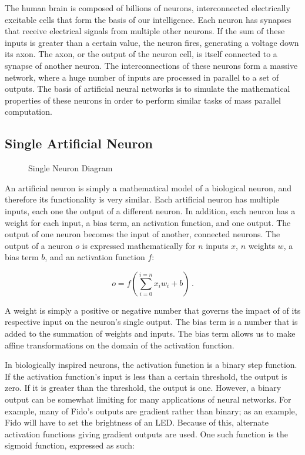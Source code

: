 The human brain is composed of billions of neurons, interconnected electrically excitable cells that form the basis of our intelligence. Each neuron has synapses that receive electrical signals from multiple other neurons. If the sum of these inputs is greater than a certain value, the neuron fires, generating a voltage down its axon. The axon, or the output of the neuron cell, is itself connected to a synapse of another neuron. The interconnections of these neurons form a massive network, where a huge number of inputs are processed in parallel to a set of outputs. The basis of artificial neural networks is to simulate the mathematical properties of these neurons in order to perform similar tasks of mass parallel computation.


\subsection{Single Artificial Neuron}


\begin{figure}[ht]
	\centering
	
	\caption{Single Neuron Diagram}
\end{figure}

An artificial neuron is simply a mathematical model of a biological neuron, and therefore its functionality is very similar. Each artificial neuron has multiple inputs, each one the output of a different neuron. In addition, each neuron has a weight for each input, a bias term, an activation function, and one output. The output of one neuron becomes the input of another, connected neurons. The output of a neuron $o$ is expressed mathematically for $n$ inputs $x$, $n$ weights $w$, a bias term $b$, and an activation function $f$:

\begin{equation}
	o = f(\sum_{i=0}^{i=n}x_i w_i + b)
	\,.
\end{equation}

A weight is simply a positive or negative number that governs the impact of of its respective input on the neuron's single output. The bias term is a number that is added to the summation of weights and inputs. The bias term allows us to make affine transformations on the domain of the activation function. 

In biologically inspired neurons, the activation function is a binary step function. If the activation function's input is less than a certain threshold, the output is zero. If it is greater than the threshold, the output is one. However, a binary output can be somewhat limiting for many applications of neural networks. For example, many of Fido's outputs are gradient rather than binary; as an example, Fido will have to set the brightness of an LED. Because of this, alternate activation functions giving gradient outputs are used. One such function is the sigmoid function, expressed as such:

